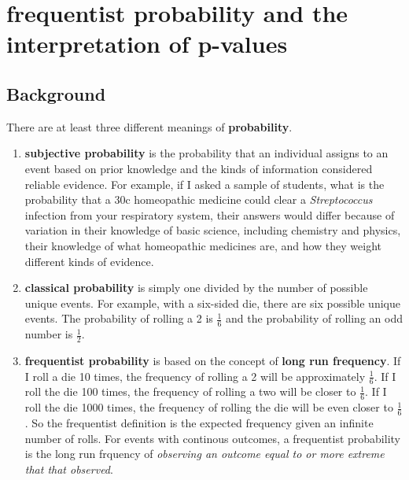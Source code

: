 \documentclass[]{book}
\begin{document}
\hypertarget{frequentist-probability-and-the-interpretation-of-p-values}{%
\section{frequentist probability and the interpretation of p-values}\label{frequentist-probability-and-the-interpretation-of-p-values}}

\hypertarget{background}{%
\subsection{Background}\label{background}}

There are at least three different meanings of \textbf{probability}.

\begin{enumerate}
\def\labelenumi{\arabic{enumi}.}
\item
  \textbf{subjective probability} is the probability that an individual assigns to an event based on prior knowledge and the kinds of information considered reliable evidence. For example, if I asked a sample of students, what is the probability that a 30c homeopathic medicine could clear a \emph{Streptococcus} infection from your respiratory system, their answers would differ because of variation in their knowledge of basic science, including chemistry and physics, their knowledge of what homeopathic medicines are, and how they weight different kinds of evidence.
\item
  \textbf{classical probability} is simply one divided by the number of possible unique events. For example, with a six-sided die, there are six possible unique events. The probability of rolling a 2 is \(\frac{1}{6}\) and the probability of rolling an odd number is \(\frac{1}{2}\).
\item
  \textbf{frequentist probability} is based on the concept of \textbf{long run frequency}. If I roll a die 10 times, the frequency of rolling a 2 will be approximately \(\frac{1}{6}\). If I roll the die 100 times, the frequency of rolling a two will be closer to \(\frac{1}{6}\). If I roll the die 1000 times, the frequency of rolling the die will be even closer to \(\frac{1}{6}\). So the frequentist definition is the expected frequency given an infinite number of rolls. For events with continous outcomes, a frequentist probability is the long run frquency of \emph{observing an outcome equal to or more extreme that that observed}.
\end{enumerate}
\end{document}
